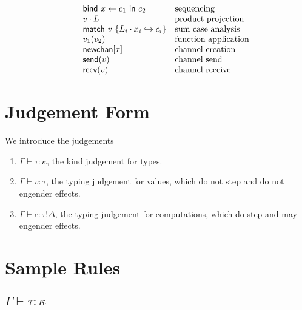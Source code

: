 \documentclass[12pt]{article}
\begin{document}
\[\begin{array}{l r l l}
                &            & \textsf{bind} \ x \leftarrow c_1
                               \ \textsf{in} \ c_2               & \text{sequencing} \\
                &            & v \cdot L                         & \text{product projection} \\
                &            & \textsf{match} \ v \ \{
                               L_i \cdot x_i \hookrightarrow c_i
                               \}                                & \text{sum case analysis} \\
                &            & v_1 (v_2)                         & \text{function application} \\
                &            & \textsf{newchan}[\tau]            & \text{channel creation} \\
                &            & \textsf{send}(v)                  & \text{channel send} \\
                &            & \textsf{recv}(v)                  & \text{channel receive} \\
\end{array}
\]

\newpage
\section{Judgement Form}

We introduce the judgements
\begin{enumerate}
\item $\Gamma \vdash \tau : \kappa$, the kind judgement for types.
\item $\Gamma \vdash v : \tau$, the typing judgement for values, which do not
step and do not engender effects.
\item $\Gamma \vdash c : \tau!\Delta$, the typing judgement for computations,
which do step and may engender effects.
\end{enumerate}

\newpage
\section{Sample Rules}

\subsection{$\Gamma \vdash \tau : \kappa$}
\end{document}
